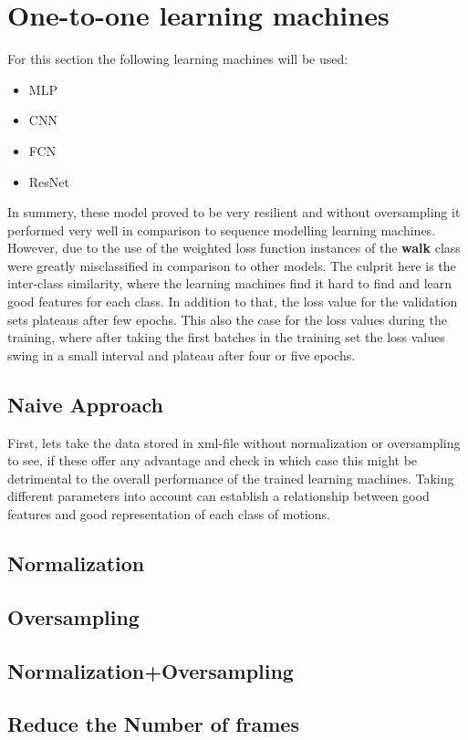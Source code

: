 	\section{One-to-one learning machines}\label{subsec:eva_one2one} 
		For this section the following learning machines will be used:
		\begin{itemize}
			\item MLP
			\item CNN
			\item FCN
			\item ResNet
		\end{itemize}
		In summery, these model proved to be very resilient and without oversampling it performed very well in comparison to sequence modelling learning machines. However, due to the use of the weighted loss function instances of the \textbf{walk} class were greatly misclassified in comparison to other models. The culprit here is the inter-class similarity, where the learning machines find it hard to find and learn good features for each class. In addition to that, the loss value for the validation sets plateaus after few epochs. This also the case for the loss values during the training, where after taking the first batches in the training set the loss values swing in a small interval and plateau after four or five epochs. 
		\subsection{Naive Approach}
			First, lets take the data stored in xml-file without normalization or oversampling to see, if these offer any advantage and check in which case this might be detrimental to the overall performance of the trained learning machines. Taking different parameters into account can establish a relationship between good features and good representation of each class of motions.\newline
		\subsection{Normalization}
		\subsection{Oversampling}
		\subsection{Normalization+Oversampling}
		\subsection{Reduce the Number of frames}

